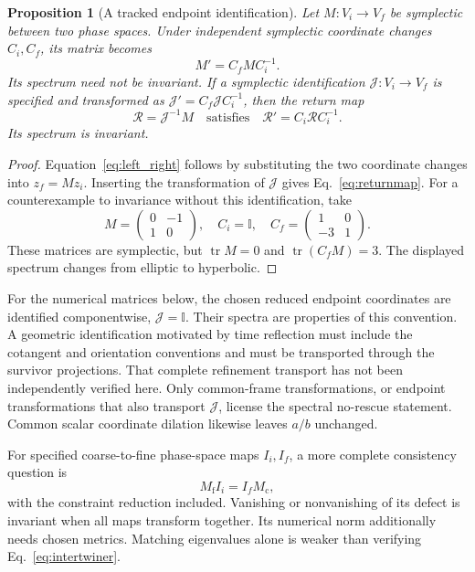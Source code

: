 \documentclass[11pt]{article}
\newtheorem{proposition}[theorem]{Proposition}
\theoremstyle{remark}\newtheorem{remark}[theorem]{Remark}
\DeclareMathOperator{\tr}{tr}
\newcommand{\Id}{\mathbb I}
\begin{document}
\begin{proposition}[A tracked endpoint identification]
\label{prop:endpoints}
Let $M:V_i\to V_f$ be symplectic between two phase spaces.
Under independent symplectic coordinate changes $C_i,C_f$, its matrix becomes
\begin{equation}
M'=C_fMC_i^{-1}.
\label{eq:left_right}
\end{equation}
Its spectrum need not be invariant.
If a symplectic identification $\mathcal J:V_i\to V_f$ is specified and transformed as
$\mathcal J'=C_f\mathcal JC_i^{-1}$, then the return map
\begin{equation}
\mathcal R=\mathcal J^{-1}M
\quad\text{satisfies}\quad
\mathcal R'=C_i\mathcal RC_i^{-1}.
\label{eq:returnmap}
\end{equation}
Its spectrum is invariant.
\end{proposition}
\begin{proof}
Equation~\eqref{eq:left_right} follows by substituting the two coordinate changes into $z_f=Mz_i$.
Inserting the transformation of $\mathcal J$ gives Eq.~\eqref{eq:returnmap}.
For a counterexample to invariance without this identification, take
\begin{equation}
M=\begin{pmatrix}0&-1\\1&0\end{pmatrix},\quad
C_i=\Id,\quad C_f=\begin{pmatrix}1&0\\-3&1\end{pmatrix}.
\label{eq:counterexample}
\end{equation}
These matrices are symplectic, but $\tr M=0$ and $\tr(C_fM)=3$.
The displayed spectrum changes from elliptic to hyperbolic.
\end{proof}

For the numerical matrices below, the chosen reduced endpoint coordinates are identified componentwise, $\mathcal J=\Id$.
Their spectra are properties of this convention.
A geometric identification motivated by time reflection must include the cotangent and orientation conventions and must be transported through the survivor projections.
That complete refinement transport has not been independently verified here.
Only common-frame transformations, or endpoint transformations that also transport $\mathcal J$, license the spectral no-rescue statement.
Common scalar coordinate dilation likewise leaves $a/b$ unchanged.

For specified coarse-to-fine phase-space maps $I_i,I_f$, a more complete consistency question is
\begin{equation}
M_{\mathrm f}I_i=I_fM_{\mathrm c},
\label{eq:intertwiner}
\end{equation}
with the constraint reduction included.
Vanishing or nonvanishing of its defect is invariant when all maps transform together.
Its numerical norm additionally needs chosen metrics.
Matching eigenvalues alone is weaker than verifying Eq.~\eqref{eq:intertwiner}.
\end{document}
